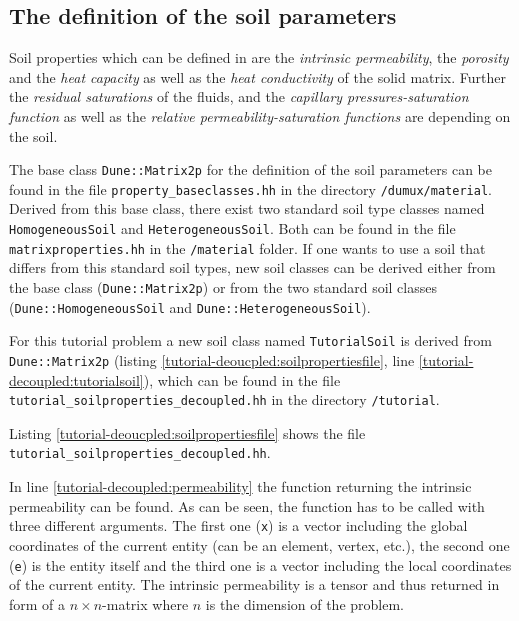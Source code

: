 \subsection{The definition of the soil parameters}\label{tutorial-decoupled:description-soil-class}

Soil properties which can be defined in \Dumux are the \textit{intrinsic permeability}, the \textit{porosity} and the \textit{heat capacity} as well as the \textit{heat conductivity} of the solid matrix. Further the \textit{residual saturations} of the fluids, and the \textit{capillary pressures-saturation function} as well as the \textit{relative permeability-saturation functions} are depending on the soil.

The base class \texttt{Dune::Matrix2p} for the definition of the soil parameters can be found in the file \texttt{property\_baseclasses.hh} in the directory \texttt{/dumux/material}. Derived from this base class, there exist two standard soil type classes named \texttt{HomogeneousSoil} and \texttt{HeterogeneousSoil}. Both can be found in the file \texttt{matrixproperties.hh} in the \texttt{/material} folder. If one wants to use a soil that differs from this standard soil types, new soil classes can be derived either from the base class (\texttt{Dune::Matrix2p}) or from the two standard soil classes (\texttt{Dune::HomogeneousSoil} and \texttt{Dune::HeterogeneousSoil}).

For this tutorial problem a new soil class named \texttt{TutorialSoil} is derived from \texttt{Dune::Matrix2p} (listing \ref{tutorial-deoucpled:soilpropertiesfile}, line \ref{tutorial-decoupled:tutorialsoil}), which can be found in the file \texttt{tutorial\_soilproperties\_decoupled.hh} in the directory \texttt{/tutorial}.

Listing \ref{tutorial-deoucpled:soilpropertiesfile} shows the file \texttt{tutorial\_soilproperties\_decoupled.hh}.

\begin{lst}\label{tutorial-deoucpled:soilpropertiesfile} \mbox{}

\end{lst}

In line \ref{tutorial-decoupled:permeability} the function returning the intrinsic permeability can be found. As can be seen, the function has to be called with three different arguments. The first one (\texttt{x}) is a vector including the global coordinates of the current entity (can be an element, vertex, etc.), the second one (\texttt{e}) is the entity itself and the third one is a vector including the local coordinates of the current entity. The intrinsic permeability is a tensor and thus returned in form of a $n \times n$-matrix where $n$ is the dimension of the problem.


